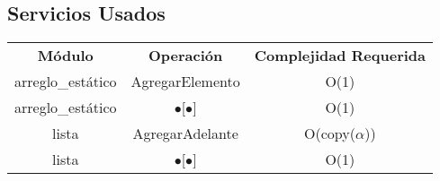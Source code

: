 \subsection{Servicios Usados}
\begin{center}
\begin{tabular*}{2.75\textwidth}{c |c | c }
\textbf{M\'odulo} & \textbf{Operaci\'on} & \textbf{Complejidad Requerida}\\
arreglo\_est\'atico & AgregarElemento & O(1)\\
arreglo\_est\'atico & $\bullet$[$\bullet$] & O(1)\\
lista & AgregarAdelante & O(copy($\alpha$))\\
lista & $\bullet$[$\bullet$] & O(1)\\
\end{tabular*}
\end{center}

